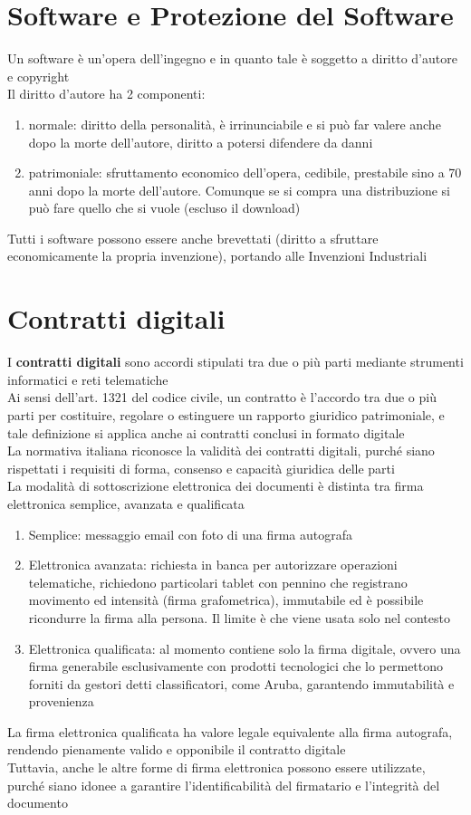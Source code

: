 \documentclass[8pt,oneside,a4paper]{article}
\begin{document}
	\section{Software e Protezione del Software}
	Un software è un'opera dell'ingegno e in quanto tale è soggetto a diritto d'autore e copyright\\
	Il diritto d'autore ha 2 componenti:
	\begin{enumerate}
		\item normale: diritto della personalità, è irrinunciabile e si può far valere anche dopo la morte dell'autore, diritto a potersi difendere da danni
		\item patrimoniale: sfruttamento economico dell'opera, cedibile, prestabile sino a 70 anni dopo la morte dell'autore. Comunque se si compra una distribuzione si può fare quello che si vuole (escluso il download)
	\end{enumerate}
	Tutti i software possono essere anche brevettati (diritto a sfruttare economicamente la propria invenzione), portando alle Invenzioni Industriali
	\section{Contratti digitali}
	I \textbf{contratti digitali} sono accordi stipulati tra due o più parti mediante strumenti informatici e reti telematiche\\
	Ai sensi dell'art. 1321 del codice civile, un contratto è l'accordo tra due o più parti per costituire, regolare o estinguere un rapporto giuridico patrimoniale, e tale definizione si applica anche ai contratti conclusi in formato digitale\\
	La normativa italiana riconosce la validità dei contratti digitali, purché siano rispettati i requisiti di forma, consenso e capacità giuridica delle parti\\
	La modalità di sottoscrizione elettronica dei documenti è distinta tra firma elettronica semplice, avanzata e qualificata\\
	\begin{enumerate}
		\item Semplice: messaggio email con foto di una firma autografa
		\item Elettronica avanzata: richiesta in banca per autorizzare operazioni telematiche, richiedono particolari tablet con pennino che registrano movimento ed intensità (firma grafometrica), immutabile ed è possibile ricondurre la firma alla persona. Il limite è che viene usata solo nel contesto
		\item Elettronica qualificata: al momento contiene solo la firma digitale, ovvero una firma generabile esclusivamente con prodotti tecnologici che lo permettono forniti da gestori detti classificatori, come Aruba, garantendo immutabilità e provenienza
	\end{enumerate}
	La firma elettronica qualificata ha valore legale equivalente alla firma autografa, rendendo pienamente valido e opponibile il contratto digitale\\
	Tuttavia, anche le altre forme di firma elettronica possono essere utilizzate, purché siano idonee a garantire l’identificabilità del firmatario e l’integrità del documento\\	
\end{document}

